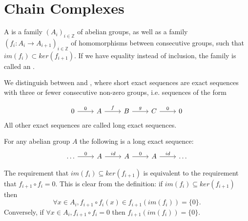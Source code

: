 \section{Chain Complexes}\label{sec-chain-complexes}
\begin{definition}
A  is a family $(A_i)_{i\in\mathbb{Z}}$ of abelian groups, as well as a family $(f_i:A_i\rightarrow A_{i+1})_{i\in \mathbb{Z}}$ of homomorphisms between consecutive groups, such that $im(f_i)\subset ker(f_{i+1})$. If we have equality instead of inclusion, the family is called an .
\end{definition}

We distinguish between  and , where short exact sequences are exact sequences with three or fewer consecutive non-zero groups, i.e. sequences of the form

\[\begin{tikzcd}
0 \arrow[r, "0"] & A \arrow[r, "f"] & B \arrow[r, "g"] & C \arrow[r, "0"] & 0
\end{tikzcd}\]
All other exact sequences are called long exact sequences. 

\begin{example}
For any abelian group $A$ the following is a long exact sequence:
\[\begin{tikzcd}
\dots \arrow[r, "0"] & A \arrow[r, "id"] & A \arrow[r, "0"] & A \arrow[r, "id"] & \dots
\end{tikzcd}\]
\end{example}

\begin{remark}
The requirement that $im(f_i)\subseteq ker(f_{i+1})$  is equivalent to the requirement that $f_{i+1}\circ f_i=0$. This is clear from the definition: if $im(f_i)\subseteq ker(f_{i+1})$ then $$\forall x\in A_i, f_{i+1}\circ f_i (x)\in f_{i+1}(im(f_i))=\{0\}.$$ Conversely, if $\forall x\in A_i, f_{i+1}\circ f_i=0$ then $f_{i+1}(im(f_i))=\{0\}$.
\end{remark}



